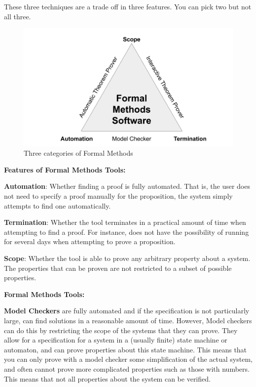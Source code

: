 \documentclass[
]{article}
\begin{document}
These three techniques are a trade off in three features. You can pick
two but not all three.

\begin{figure}
\hypertarget{fig:formal_methods}{%
\centering
\includegraphics{./Images/formalmethods.png}
\caption{Three categories of Formal Methods}\label{fig:formal_methods}
}
\end{figure}

\textbf{Features of Formal Methods Tools:}

\textbf{Automation}: Whether finding a proof is fully automated. That
is, the user does not need to specify a proof manually for the
proposition, the system simply attempts to find one automatically.

\textbf{Termination}: Whether the tool terminates in a practical amount
of time when attempting to find a proof. For instance, does not have the
possibility of running for several days when attempting to prove a
proposition.

\textbf{Scope}: Whether the tool is able to prove any arbitrary property
about a system. The properties that can be proven are not restricted to
a subset of possible properties.

\textbf{Formal Methods Tools:}

\textbf{Model Checkers} are fully automated and if the specification is
not particularly large, can find solutions in a reasonable amount of
time. However, Model checkers can do this by restricting the scope of
the systems that they can prove. They allow for a specification for a
system in a (usually finite) state machine or automaton, and can prove
properties about this state machine. This means that you can only prove
with a model checker some simplification of the actual system, and often
cannot prove more complicated properties such as those with numbers.
This means that not all properties about the system can be verified.
\end{document}
